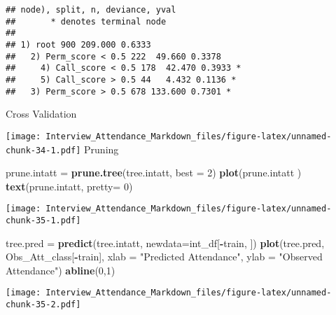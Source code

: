 \documentclass[]{article}
\newenvironment{Shaded}{\begin{snugshade}}{\end{snugshade}}
\newcommand{\KeywordTok}[1]{\textcolor[rgb]{0.13,0.29,0.53}{\textbf{#1}}}
\newcommand{\DataTypeTok}[1]{\textcolor[rgb]{0.13,0.29,0.53}{#1}}
\newcommand{\DecValTok}[1]{\textcolor[rgb]{0.00,0.00,0.81}{#1}}
\newcommand{\StringTok}[1]{\textcolor[rgb]{0.31,0.60,0.02}{#1}}
\newcommand{\OperatorTok}[1]{\textcolor[rgb]{0.81,0.36,0.00}{\textbf{#1}}}
\newcommand{\NormalTok}[1]{#1}
\begin{document}
\begin{verbatim}
## node), split, n, deviance, yval
##       * denotes terminal node
## 
## 1) root 900 209.000 0.6333  
##   2) Perm_score < 0.5 222  49.660 0.3378  
##     4) Call_score < 0.5 178  42.470 0.3933 *
##     5) Call_score > 0.5 44   4.432 0.1136 *
##   3) Perm_score > 0.5 678 133.600 0.7301 *
\end{verbatim}

Cross Validation

\begin{Shaded}
\end{Shaded}

\texttt{[image: Interview\_Attendance\_Markdown\_files/figure-latex/unnamed-chunk-34-1.pdf]}
Pruning

\begin{Shaded}
\begin{Highlighting}[]
\NormalTok{prune.intatt =}\StringTok{ }\KeywordTok{prune.tree}\NormalTok{(tree.intatt, }\DataTypeTok{best =} \DecValTok{2}\NormalTok{)}
\KeywordTok{plot}\NormalTok{(prune.intatt )}
\KeywordTok{text}\NormalTok{(prune.intatt, }\DataTypeTok{pretty=} \DecValTok{0}\NormalTok{)}
\end{Highlighting}
\end{Shaded}

\texttt{[image: Interview\_Attendance\_Markdown\_files/figure-latex/unnamed-chunk-35-1.pdf]}

\begin{Shaded}
\begin{Highlighting}[]
\NormalTok{tree.pred =}\StringTok{ }\KeywordTok{predict}\NormalTok{(tree.intatt, }\DataTypeTok{newdata=}\NormalTok{int_df[}\OperatorTok{-}\NormalTok{train, ])}
\KeywordTok{plot}\NormalTok{(tree.pred, Obs_Att_class[}\OperatorTok{-}\NormalTok{train], }\DataTypeTok{xlab =} \StringTok{"Predicted Attendance"}\NormalTok{, }\DataTypeTok{ylab =} \StringTok{"Observed Attendance"}\NormalTok{)}
\KeywordTok{abline}\NormalTok{(}\DecValTok{0}\NormalTok{,}\DecValTok{1}\NormalTok{)}
\end{Highlighting}
\end{Shaded}

\texttt{[image: Interview\_Attendance\_Markdown\_files/figure-latex/unnamed-chunk-35-2.pdf]}
\end{document}
